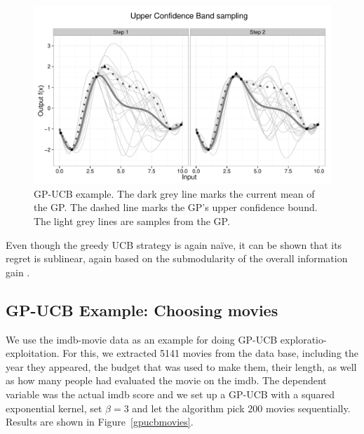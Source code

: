 \documentclass[authoryear,11pt,review]{elsarticle}
\begin{document}
\begin{figure}[ht]
\caption{GP-UCB example. The dark grey line marks the current mean of the GP. The dashed line marks the GP's upper confidence bound. The light grey lines are samples from the GP.}
\label{gpucb}
 \centering
  \includegraphics[scale=0.5]{figs/ucbexample.pdf}
\end{figure}

Even though the greedy UCB strategy is again na\"{i}ve, it can be shown that its regret is sublinear, again based on the submodularity of the overall information gain \citep{srinivas2009gaussian}. 

\subsection{GP-UCB Example: Choosing movies}
We use the imdb-movie data as an example for doing GP-UCB exploratio-exploitation. For this, we extracted 5141 movies from the data base, including the year they appeared, the budget that was used to make them, their length, as well as how many people had evaluated the movie on the imdb. The dependent variable was the actual imdb score and we set up a GP-UCB with a squared exponential kernel, set $\beta=3$ and let the algorithm pick 200 movies sequentially. Results are shown in Figure~\ref{gpucbmovies}.
\end{document}

